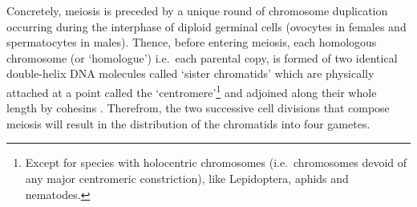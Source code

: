 


Concretely, meiosis is preceded by a unique round of chromosome duplication occurring during the interphase of diploid germinal cells (ovocytes in females and spermatocytes in males).
Thence, before entering meiosis, each homologous chromosome (or ‘homologue’) i.e.\ each parental copy, is formed of two identical double-helix DNA molecules called ‘sister chromatids’ which are physically attached at a point called the ‘centromere’\footnote{Except for species with holocentric chromosomes (i.e.\ chromosomes devoid of any major centromeric constriction), like Lepidoptera, aphids and nematodes.} and adjoined along their whole length by cohesins \citep{klein1999central}.
Therefrom, the two successive cell divisions that compose meiosis will result in the distribution of the chromatids into four gametes.

